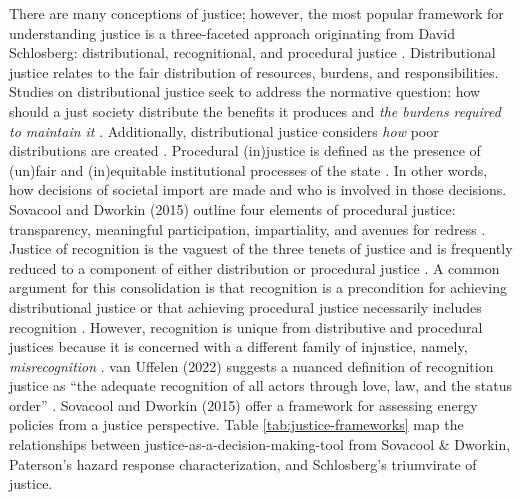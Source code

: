     
    There are many conceptions of justice; however, the most popular framework
    for understanding justice is a three-faceted approach originating from David
    Schlosberg: distributional, recognitional, and procedural justice
    \cite{schlosberg_2_2007}.
    Distributional justice relates to the fair distribution of resources,
    burdens, and responsibilities. Studies on distributional justice seek to
    address the normative question: how should a just society distribute the
    benefits it produces and \textit{the burdens required to maintain it}
    \cite{brighouse_justice_2004}. Additionally, distributional justice
    considers \textit{how} poor distributions are created
    \cite{schlosberg_2_2007}.
    Procedural (in)justice is defined as the presence of (un)fair and
    (in)equitable institutional processes of the state \cite{schlosberg_2_2007}.
    In other words, how decisions of societal import are made and who is
    involved in those decisions. Sovacool and Dworkin (2015) outline four
    elements of procedural justice: transparency, meaningful participation,
    impartiality, and avenues for redress \cite{sovacool_energy_2015}.    
Justice of recognition is the vaguest of the three tenets of justice and is
    frequently reduced to a component of either distribution or procedural
    justice \cite{schlosberg_2_2007, van_uffelen_revisiting_2022}. A common
    argument for this consolidation is that recognition is a precondition for
    achieving distributional justice or that achieving procedural justice
    necessarily includes recognition \cite{schlosberg_2_2007}. However,
    recognition is unique from distributive and procedural justices because it
    is concerned with a different family of injustice, namely,
    \textit{misrecognition} \cite{van_uffelen_revisiting_2022}. van Uffelen
    (2022) suggests a nuanced definition of recognition justice as ``the
    adequate recognition of all actors through love, law, and the status order''
    \cite{van_uffelen_revisiting_2022}.
Sovacool and Dworkin (2015) offer a framework for assessing energy policies from
a justice perspective. Table \ref{tab:justice-frameworks} map the relationships
between justice-as-a-decision-making-tool from Sovacool \& Dworkin, Paterson's
hazard response characterization, and Schlosberg's triumvirate of justice. 

